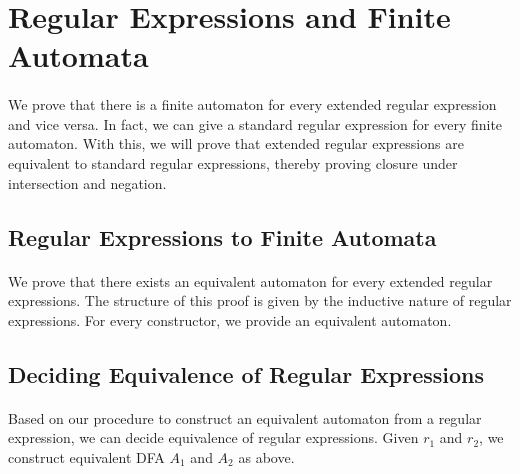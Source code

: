 
                            \section{Regular Expressions and Finite Automata}

                            \paragraph{} 
                            We prove that there is a finite automaton for every extended regular expression and vice versa. 
                            In fact, we can give a standard regular expression for every finite automaton.
                            With this, we will prove that extended regular expressions are equivalent to standard regular expressions, 
                            thereby proving closure under intersection and negation.


                            \subsection{Regular Expressions to Finite Automata}

                            \paragraph{} 
                            We prove that there exists an equivalent automaton for every extended regular expressions.
                            The structure of this proof is given by the inductive nature of regular expressions.
                            For every constructor, we provide an equivalent automaton.


                            \subsection{Deciding Equivalence of Regular Expressions}

                            \paragraph{} 
                            Based on our procedure to construct an equivalent automaton from a regular expression, we can decide equivalence of regular expressions. Given $r_1$ and $r_2$, we construct equivalent DFA $A_1$ and $A_2$ as above.


